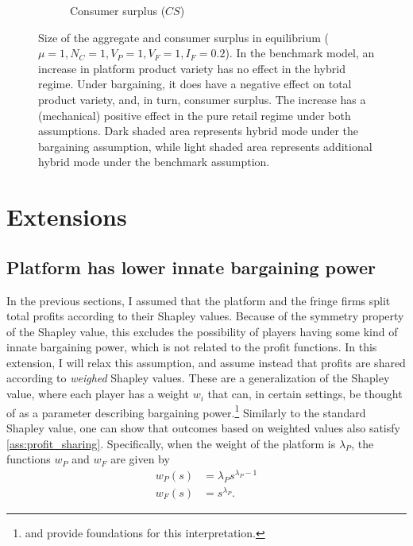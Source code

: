 \documentclass[a4paper]{article}
\begin{document}
\begin{figure}
\begin{subfigure}[b]{0.45\textwidth}
        \caption{Consumer surplus ($CS$)}
    \end{subfigure}
    \caption{Size of the aggregate and consumer surplus in equilibrium ($\mu = 1, N_C = 1, V_P = 1, V_F = 1, I_F = 0.2$). In the benchmark model, an increase in platform product variety has no effect in the hybrid regime. Under bargaining, it does have a negative effect on total product variety, and, in turn, consumer surplus. The increase has a (mechanical) positive effect in the pure retail regime under both assumptions. Dark shaded area represents hybrid mode under the bargaining assumption, while light shaded area represents additional hybrid mode under the benchmark assumption.}
    \label{fig:welfare}
\end{figure}


\section{Extensions}

\subsection{Platform has lower innate bargaining power}
\label{sec:lower_bargaining_power}

In the previous sections, I assumed that the platform and the fringe firms split total profits according to their Shapley values.
Because of the symmetry property of the Shapley value, this excludes the possibility of players having some kind of innate bargaining power, which is not related to the profit functions.
In this extension, I will relax this assumption, and assume instead that profits are shared according to \emph{weighed} Shapley values.
These are a generalization of the Shapley value, where each player has a weight $w_i$ that can, in certain settings, be thought of as a parameter describing bargaining power.\footnote{
    \textcite{hart1996bargaining} and \textcite{stole1996intra} provide foundations for this interpretation.
}
Similarly to the standard Shapley value, one can show that outcomes based on weighted values also satisfy \cref{ass:profit_sharing}.
Specifically, when the weight of the platform is $\lambda_P$, the functions $w_P$ and $w_F$ are given by
\begin{align*}
    w_P(s) &= \lambda_P s ^ {\lambda_P - 1} \\
    w_F(s) &= s ^ {\lambda_P}.
\end{align*}
\end{document}
